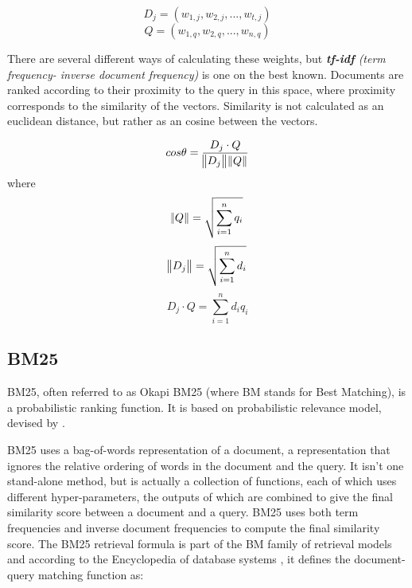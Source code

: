 \begin{equation}
D_j = (w_{1,j}, w_{2,j},...,w_{t,j})
\end{equation}
\begin{equation}
Q = (w_{1,q}, w_{2,q},...,w_{n,q}) 
\end{equation}

There are several different ways of calculating these weights, but \textit{\textbf{tf-idf} (term frequency- inverse document frequency)} is one on the best known. Documents are ranked according to their proximity to the query in this space, where proximity corresponds to the similarity of the vectors. Similarity is not calculated as an euclidean distance, but rather as an cosine between the vectors.

\begin{equation}
cos\theta = \frac{D_j \cdot Q}{\norm{D_j} \norm{Q}}  
\end{equation} 
where
\begin{equation}
\norm{Q} = \sqrt{\sum\limits_{i=1}^n q_i }
\end{equation}
\begin{equation}
\norm{D_j} = \sqrt{\sum\limits_{i=1}^n d_i }
\end{equation}
\begin{equation}
D_j \cdot Q = \sum\limits_{i=1}^n d_i q_i
\end{equation}



\subsection{BM25}

BM25, often referred to as Okapi BM25 (where BM stands for Best Matching), is a probabilistic ranking function. It is based on probabilistic relevance model, devised by \citep{robertson1996okapi}. 

BM25 uses a bag-of-words representation of a document, a representation that ignores the relative ordering of words in the document and the query. It isn't one stand-alone method, but is actually a collection of functions, each of which uses different hyper-parameters, the outputs of which are combined to give the final similarity score between a document and a query. BM25 uses both term frequencies and inverse document frequencies to compute the final similarity score. The BM25 retrieval formula is part of the BM family of retrieval models and according to the Encyclopedia of database systems \citep{amati2009bm25}, it defines the document-query matching function as:

